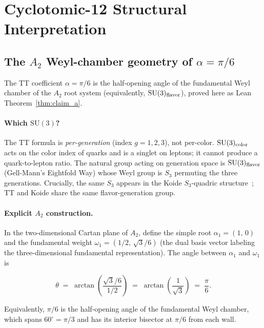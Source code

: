 \documentclass[11pt]{article}
\theoremstyle{remark}
\newcommand{\paren}[1]{\left(#1\right)}
\begin{document}
\section{Cyclotomic-12 Structural Interpretation}
\label{sec:cyclotomic}

\subsection{The $A_2$ Weyl-chamber geometry of $\alpha=\pi/6$}
\label{sec:su3_weyl}

The TT coefficient $\alpha=\pi/6$ is the half-opening angle of the fundamental
Weyl chamber of the $A_2$ root system (equivalently, $\mathrm{SU}(3)_{\rm flavor}$),
proved here as Lean Theorem~\ref{thm:claim_a}.

\paragraph{Which $\mathrm{SU}(3)$?}
The TT formula is \emph{per-generation} (index $g=1,2,3$), not per-color.
$\mathrm{SU}(3)_{\rm color}$ acts on the color index of quarks and is a singlet on
leptons; it cannot produce a quark-to-lepton ratio.  The natural group acting on
generation space is $\mathrm{SU}(3)_{\rm flavor}$ (Gell-Mann's Eightfold Way)
whose Weyl group is $S_3$ permuting the three generations.
Crucially, the same $S_3$ appears in the Koide $S_3$-quadric structure~\cite{Spivack2026_Koide};
TT and Koide share the same flavor-generation group.

\paragraph{Explicit $A_2$ construction.}
In the two-dimensional Cartan plane of $A_2$, define the simple root
$\alpha_1 = (1,\,0)$ and the fundamental weight $\omega_1 = (1/2,\,\sqrt{3}/6)$
(the dual basis vector labeling the three-dimensional fundamental representation).
The angle between $\alpha_1$ and $\omega_1$ is

\begin{equation}
  \theta \;=\; \arctan\!\paren{\frac{\sqrt{3}/6}{1/2}}
           \;=\; \arctan\!\paren{\frac{1}{\sqrt{3}}}
           \;=\; \frac{\pi}{6}.
  \label{eq:A2_angle}
\end{equation}

Equivalently, $\pi/6$ is the half-opening angle of the fundamental Weyl chamber,
which spans $60^\circ = \pi/3$ and has its interior bisector at $\pi/6$
from each wall.
\end{document}
